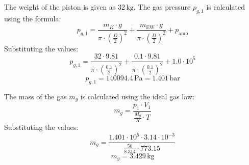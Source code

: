 The weight of the piston is given as \( 32 \, \text{kg} \). The gas pressure \( p_{g,1} \) is calculated using the formula:  
\[
p_{g,1} = \frac{m_K \cdot g}{\pi \cdot \left(\frac{D}{2}\right)^2} + \frac{m_{\text{EW}} \cdot g}{\pi \cdot \left(\frac{D}{2}\right)^2} + p_{\text{amb}}
\]  
Substituting the values:  
\[
p_{g,1} = \frac{32 \cdot 9.81}{\pi \cdot \left(\frac{0.1}{2}\right)^2} + \frac{0.1 \cdot 9.81}{\pi \cdot \left(\frac{0.1}{2}\right)^2} + 1.0 \cdot 10^5
\]  
\[
p_{g,1} = 140094.4 \, \text{Pa} = 1.401 \, \text{bar}
\]  

The mass of the gas \( m_g \) is calculated using the ideal gas law:  
\[
m_g = \frac{p_1 \cdot V_1}{\frac{M_g}{R} \cdot T}
\]  
Substituting the values:  
\[
m_g = \frac{1.401 \cdot 10^5 \cdot 3.14 \cdot 10^{-3}}{\frac{50}{8.314} \cdot 773.15}
\]  
\[
m_g = 3.429 \, \text{kg}
\]